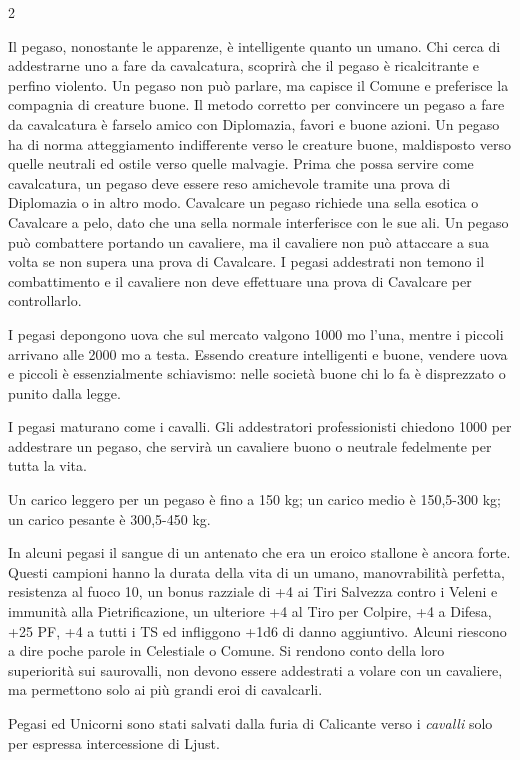 \begin{multicols}{2}
{Il pegaso, nonostante le apparenze, è intelligente quanto un umano. Chi cerca di addestrarne uno a fare da cavalcatura, scoprirà che il pegaso è ricalcitrante e perfino violento. Un pegaso non può parlare, ma capisce il Comune e preferisce la compagnia di creature buone. Il metodo corretto per convincere un pegaso a fare da cavalcatura è farselo amico con Diplomazia, favori e buone azioni. Un pegaso ha di norma atteggiamento indifferente verso le creature buone, maldisposto verso quelle neutrali ed ostile verso quelle malvagie. Prima che possa servire come cavalcatura, un pegaso deve essere reso amichevole tramite una prova di Diplomazia o in altro modo. Cavalcare un pegaso richiede una sella esotica o Cavalcare a pelo, dato che una sella normale interferisce con le sue ali. Un pegaso può combattere portando un cavaliere, ma il cavaliere non può attaccare a sua volta se non supera una prova di Cavalcare. I pegasi addestrati non temono il combattimento e il cavaliere non deve effettuare una prova di Cavalcare per controllarlo.

I pegasi depongono uova che sul mercato valgono 1000 mo l'una, mentre i piccoli arrivano alle 2000 mo a testa. Essendo creature intelligenti e buone, vendere uova e piccoli è essenzialmente schiavismo: nelle società buone chi lo fa è disprezzato o punito dalla legge.

I pegasi maturano come i cavalli. Gli addestratori professionisti chiedono 1000 per addestrare un pegaso, che servirà un cavaliere buono o neutrale fedelmente per tutta la vita.

Un carico leggero per un pegaso è fino a 150 kg; un carico medio è 150,5-300 kg; un carico pesante è 300,5-450 kg.

In alcuni pegasi il sangue di un antenato che era un eroico stallone è ancora forte. Questi campioni hanno la durata della vita di un umano, manovrabilità perfetta, resistenza al fuoco 10, un bonus razziale di +4 ai Tiri Salvezza contro i Veleni e immunità alla Pietrificazione, un ulteriore +4 al Tiro per Colpire, +4 a Difesa, +25 PF, +4 a tutti i TS ed infliggono +1d6 di danno aggiuntivo. Alcuni riescono a dire poche parole in Celestiale o Comune. Si rendono conto della loro superiorità sui saurovalli, non devono essere addestrati a volare con un cavaliere, ma permettono solo ai più grandi eroi di cavalcarli.

Pegasi ed Unicorni sono stati salvati dalla furia di Calicante verso i \emph{cavalli} solo per espressa intercessione di Ljust.

}
\end{multicols}
